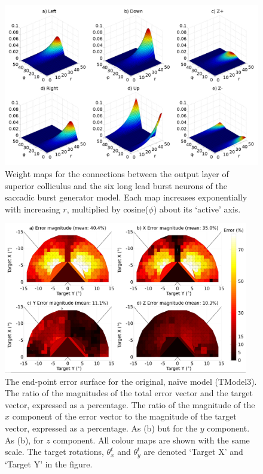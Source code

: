 \documentclass{frontiersSCNS}
\begin{document}
\begin{figure}[!ht]
\begin{center}
\includegraphics[width=\textwidth]{./figures/weightmaps.png}
\end{center}
\caption{ Weight maps for the connections between the output layer of superior
colliculus and the six long lead burst neurons of the saccadic burst
generator model. Each map increases exponentially with increasing $r$,
multiplied by cosine($\phi$) about its `active' axis.}
\label{fig:weightmaps}
\end{figure}

\begin{figure}[!ht]
\begin{center}
\includegraphics[width=0.95\textwidth]{./figures/errorsurface_TModel3.png}
\end{center}
\caption{ The end-point error surface for the original, na\"ive model
(TModel3).  The ratio of the magnitudes of the total error vector
and the target vector, expressed as a percentage.  The ratio of the
magnitude of the $x$ component of the error vector to the magnitude of
the target vector, expressed as a percentage.  As (b) but for the
$y$ component.  As (b), for $z$ component. All colour maps are shown
with the same scale. The target rotations, $\theta_{x}^t$ and
$\theta_{y}^t$ are denoted `Target X' and `Target Y' in the figure.}
\label{fig:errorsurfaceTM3}
\end{figure}
\end{document}
